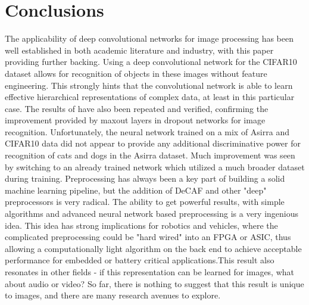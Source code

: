 \documentclass[journal]{IEEEtran}
\begin{document}
\section{Conclusions}
The applicability of deep convolutional networks for image processing 
has been well established in both academic literature and industry, with this 
paper providing further backing. Using a deep convolutional network for the 
CIFAR10 dataset allows for recognition of objects in these images without 
feature engineering. This strongly hints that the convolutional network is able
to learn effective hierarchical representations of complex data, at least 
in this particular case. The results of \cite{Maxout} have also been repeated 
and verified, confirming the improvement provided by maxout layers in dropout
networks for image recognition. Unfortunately, the neural network trained on
a mix of Asirra and CIFAR10 data did not appear to provide any additional 
discriminative power for recognition of cats and dogs in the Asirra dataset. 
Much improvement was seen by switching to an already trained network which 
utilized a much broader dataset during training.
Preprocessing has always been a key part of building a solid machine learning 
pipeline, but the addition of DeCAF and other "deep" preprocessors is very
radical. The ability to get powerful results, with simple algorithms and 
advanced neural network based preprocessing is a very ingenious idea.
This idea has strong implications for robotics and vehicles, where the
complicated preprocessing could be "hard wired" into an FPGA or ASIC, 
thus allowing a computationally light algorithm on the back end to achieve
acceptable performance for embedded or battery critical applications.This 
result also resonates in other fields - if this representation can be 
learned for images, what about audio or video? So far, there is nothing to
suggest that this result is unique to images, and there are many research
avenues to explore.
\end{document}
